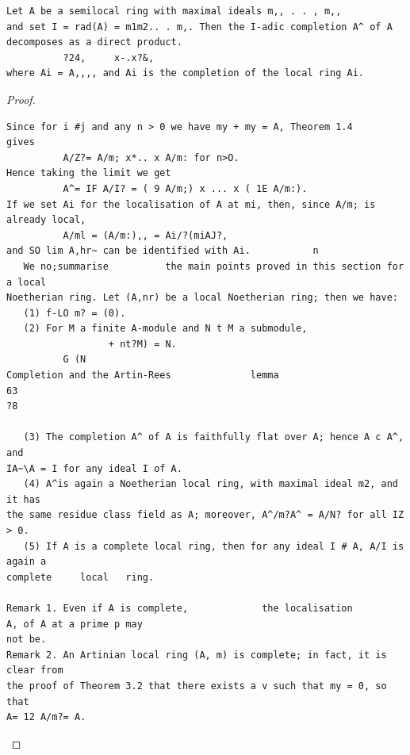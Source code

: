 \begin{theorem}\label{mcrt-auto-theorem-8-15}\uses{}
\begin{verbatim}
Let A be a semilocal ring with maximal ideals m,, . . , m,,
and set I = rad(A) = m1m2.. . m,. Then the I-adic completion A^ of A
decomposes as a direct product.
          ?24,     x-.x?&,
where Ai = A,,,, and Ai is the completion of the local ring Ai.
\end{verbatim}
\end{theorem}
\begin{proof}
\begin{verbatim}
Since for i #j and any n > 0 we have my + my = A, Theorem 1.4
gives
          A/Z?= A/m; x*.. x A/m: for n>O.
Hence taking the limit we get
          A^= IF A/I? = ( 9 A/m;) x ... x ( 1E A/m:).
If we set Ai for the localisation of A at mi, then, since A/m; is already local,
          A/ml = (A/m:),, = Ai/?(miAJ?,
and SO lim A,hr~ can be identified with Ai.           n
   We no;summarise          the main points proved in this section for a local
Noetherian ring. Let (A,nr) be a local Noetherian ring; then we have:
   (1) f-LO m? = (0).
   (2) For M a finite A-module and N t M a submodule,
                  + nt?M) = N.
          G (N
Completion and the Artin-Rees              lemma                                     63
?8

   (3) The completion A^ of A is faithfully flat over A; hence A c A^, and
IA~\A = I for any ideal I of A.
   (4) A^is again a Noetherian local ring, with maximal ideal m2, and it has
the same residue class field as A; moreover, A^/m?A^ = A/N? for all IZ > 0.
   (5) If A is a complete local ring, then for any ideal I # A, A/I is again a
complete     local   ring.

Remark 1. Even if A is complete,             the localisation        A, of A at a prime p may
not be.
Remark 2. An Artinian local ring (A, m) is complete; in fact, it is clear from
the proof of Theorem 3.2 that there exists a v such that my = 0, so that
A= 12 A/m?= A.
\end{verbatim}
\end{proof}


